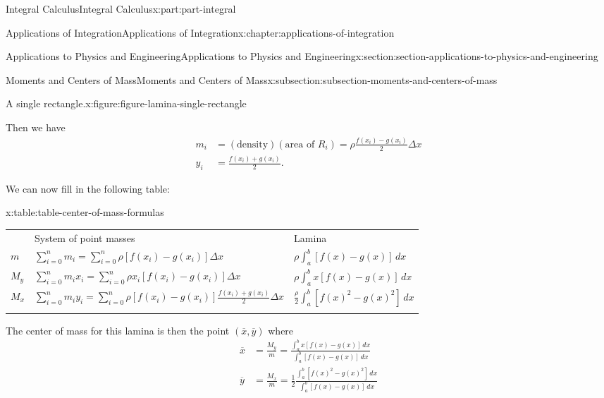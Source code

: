 \documentclass[twoside,10pt,]{tufte-book}
\newcommand{\tabularfont}{\relax}
\numberwithin{equation}{part}
\newcommand{\hrulethick} {\noalign{\hrule height 0.11em}}
\newcommand{\amp}{&}
\begin{document}
\begin{partptx}{Integral Calculus}{}{Integral Calculus}{}{}{x:part:part-integral}
\begin{chapterptx}{Applications of Integration}{}{Applications of Integration}{}{}{x:chapter:applications-of-integration}
\begin{sectionptx}{Applications to Physics and Engineering}{}{Applications to Physics and Engineering}{}{}{x:section:section-applications-to-physics-and-engineering}
\begin{subsectionptx}{Moments and Centers of Mass}{}{Moments and Centers of Mass}{}{}{x:subsection:subsection-moments-and-centers-of-mass}
\begin{figureptx}{A single rectangle.}{x:figure:figure-lamina-single-rectangle}{}
\begin{image}{0}{1}{0}
{
}%
\end{image}%
\tcblower
\end{figureptx}%
Then we have%
\begin{align*}
m_{i} \amp= (\text{density})(\text{area of }R_{i}) = \rho\frac{f(x_{i})-g(x_{i})}{2}\Delta x\\
y_{i} \amp= \frac{f(x_{i})+g(x_{i})}{2}.
\end{align*}
%
\par
We can now fill in the following table:%
\begin{tableptx}{\textbf{}}{x:table:table-center-of-mass-formulas}{}%
\centering%
{\tabularfont%
\begin{tabular}{lll}\hrulethick
&System of point masses&Lamina\tabularnewline\hrulethick
\(m\)&\(\sum_{i=0}^{n}m_{i} = \sum_{i=0}^{n}\rho[f(x_{i})-g(x_{i})]\Delta x\)&\(\rho\int_{a}^{b}[f(x)-g(x)]\,dx\)\tabularnewline[0pt]
\(M_{y}\)&\(\sum_{i=0}^{n}m_{i}x_{i} = \sum_{i=0}^{n}\rho x_{i}[f(x_{i})-g(x_{i})]\Delta x\)&\(\rho\int_{a}^{b}x[f(x)-g(x)]\,dx\)\tabularnewline[0pt]
\(M_{x}\)&\(\sum_{i=0}^{n}m_{i}y_{i} = \sum_{i=0}^{n}\rho[f(x_{i})-g(x_{i})]\frac{f(x_{i})+g(x_{i})}{2}\Delta x\)&\(\frac{\rho}{2}\int_{a}^{b}[f(x)^{2}-g(x)^{2}]\,dx\)\tabularnewline\hrulethick
\end{tabular}
}%
\end{tableptx}%
The center of mass for this lamina is then the point \((\overline{x},\overline{y})\) where%
\begin{align*}
\overline{x} \amp= \frac{M_{y}}{m} = \frac{\int_{a}^{b}x[f(x)-g(x)]\,dx}{\int_{a}^{b}[f(x)-g(x)]\,dx}\\
\overline{y} \amp= \frac{M_{x}}{m} = \frac{1}{2}\frac{\int_{a}^{b}[f(x)^{2}-g(x)^{2}]\,dx}{\int_{a}^{b}[f(x)-g(x)]\,dx}
\end{align*}
%
\end{subsectionptx}
\end{sectionptx}
%
%
\typeout{************************************************}

\end{chapterptx}
\end{partptx}
\end{document}

